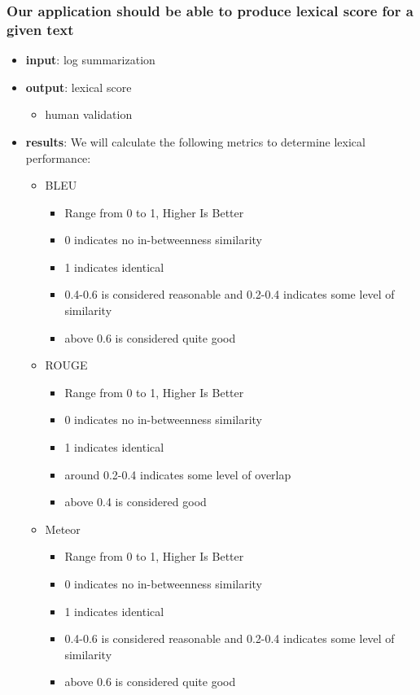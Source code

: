 \documentclass[conference]{IEEEtran}
\begin{document}
\subsubsection{Our application should be able to produce lexical score for a given text}
\begin{itemize}
    \item \textbf{input}: log summarization
    \item \textbf{output}: lexical score 
    \begin{itemize}
        \item human validation
    \end{itemize}
     \item \textbf{results}: 
     We will calculate the following metrics to determine lexical performance:
     \begin{itemize}
     \item BLEU
        \begin{itemize}
        \item Range from 0 to 1, Higher Is Better
        \item 0 indicates no in-betweenness similarity
        \item 1 indicates identical
        \item 0.4-0.6 is considered reasonable and 0.2-0.4 indicates some level of similarity
        \item above 0.6 is considered quite good
        \end{itemize}
    \item ROUGE
        \begin{itemize}
        \item Range from 0 to 1, Higher Is Better
        \item 0 indicates no in-betweenness similarity
        \item 1 indicates identical
        \item around 0.2-0.4 indicates some level of overlap
        \item above 0.4 is considered good
        \end{itemize}
    \item Meteor
        \begin{itemize}
        \item Range from 0 to 1, Higher Is Better
        \item 0 indicates no in-betweenness similarity
        \item 1 indicates identical
        \item 0.4-0.6 is considered reasonable and 0.2-0.4 indicates some level of similarity
        \item above 0.6 is considered quite good
        \end{itemize}
    \end{itemize}
\end{itemize}
\end{document}
